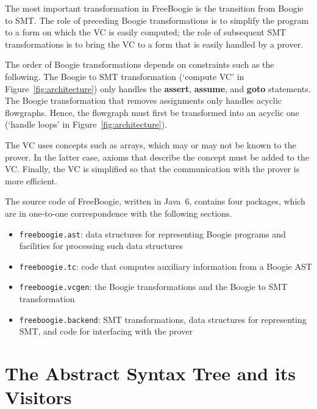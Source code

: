\documentclass{llncs}
\begin{document}
The most important transformation in FreeBoogie is the
transition from Boogie to SMT\null. The role of preceding Boogie
transformations is to simplify the program to a form on which the
VC is easily computed; the role of subsequent SMT transformations
is to bring the VC to a form that is easily handled by a prover.

The order of Boogie transformations depends on constraints
such as the following. The Boogie to SMT transformation
(`compute VC' in Figure~\ref{fig:architecture}) only handles
the \textbf{assert}, \textbf{assume}, and \textbf{goto}
statements. The Boogie transformation that removes assignments
only handles acyclic flowgraphs. Hence, the flowgraph must
first be transformed into an acyclic one (`handle loops' in
Figure~\ref{fig:architecture}).

The VC uses concepts such as arrays, which may or may not be
known to the prover. In the latter case, axioms that describe
the concept must be added to the VC\null. Finally, the VC is
simplified so that the communication with the prover is
more efficient.

The source code of FreeBoogie, written in Java~6, contains
four packages, which are in one-to-one correspondence with the
following sections.

\begin{itemize}
\item \texttt{freeboogie.ast}: data structures for representing
  Boogie programs and facilities for processing such data structures
\item \texttt{freeboogie.tc}: code that computes auxiliary information
  from a Boogie AST
\item \texttt{freeboogie.vcgen}: the Boogie transformations and
  the Boogie to SMT transformation
\item \texttt{freeboogie.backend}: 
  SMT transformations, 
  data structures for representing SMT, 
  and code for interfacing with the prover
\end{itemize}

\section{The Abstract Syntax Tree and its Visitors} %
\label{sec:design.ast}
\end{document}
